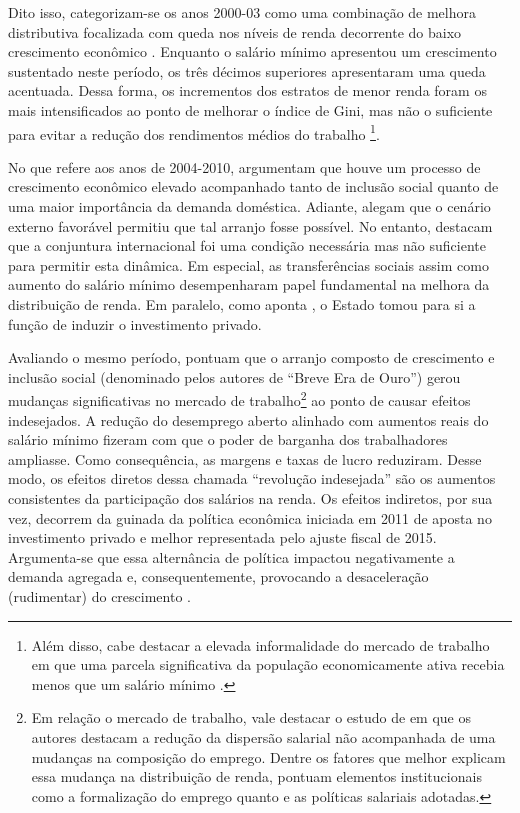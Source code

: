 Dito isso, categorizam-se os anos 2000-03 como uma combinação de melhora distributiva focalizada com queda nos níveis de renda decorrente do baixo crescimento econômico \cite{dedecca_reducao_2014}. Enquanto o salário mínimo apresentou um crescimento sustentado neste período, os três décimos superiores apresentaram uma queda acentuada. Dessa forma, os incrementos dos estratos de menor renda foram os mais intensificados ao ponto de melhorar o índice de Gini, mas não o suficiente para evitar a redução dos rendimentos médios do trabalho \cite{saboia_o_2007}\footnote{Além disso, cabe destacar a elevada informalidade do mercado de trabalho em que uma parcela significativa da população economicamente ativa recebia menos que um salário mínimo \cite[p.~486]{saboia_o_2007}.}. 

No que refere aos anos de 2004-2010, \textcite{correa_notas_2013} argumentam que houve um processo de crescimento econômico elevado acompanhado tanto de inclusão social quanto de uma maior importância da demanda doméstica. Adiante, alegam que o cenário externo favorável permitiu que tal arranjo fosse possível. No entanto, destacam que a conjuntura internacional foi uma condição necessária mas não suficiente para permitir esta dinâmica. Em especial, as transferências sociais assim como aumento do salário mínimo desempenharam papel fundamental na melhora da distribuição de renda. Em paralelo, como aponta \textcite{dos_santos_notas_2013}, o Estado tomou para si a função de induzir o investimento privado.

Avaliando o mesmo período, \textcite{serrano_conflito_2018} pontuam que o arranjo composto de crescimento e inclusão social (denominado pelos autores de ``Breve Era de Ouro'') gerou mudanças significativas no mercado de trabalho\footnote{Em relação o mercado de trabalho, vale destacar o estudo de \textcite{carneiro_politica_2018-1} em que os autores destacam a redução da dispersão salarial não acompanhada de uma mudanças na composição do emprego. Dentre os fatores que melhor explicam essa mudança na distribuição de renda, pontuam elementos institucionais como a formalização do emprego quanto e as políticas salariais adotadas.} ao ponto de causar efeitos indesejados. A redução do desemprego aberto alinhado com aumentos reais do salário mínimo fizeram com que o poder de barganha dos trabalhadores ampliasse. Como consequência, as margens e taxas de lucro reduziram. Desse modo, os efeitos diretos dessa chamada ``revolução indesejada'' são os aumentos consistentes da participação dos salários na renda. Os efeitos indiretos, por sua vez, decorrem da guinada da política econômica iniciada em 2011 de aposta no investimento privado e melhor representada pelo ajuste fiscal de 2015. Argumenta-se que essa alternância de política impactou negativamente a demanda agregada e, consequentemente, provocando a desaceleração (rudimentar) do crescimento \cite{serrano_demanda_2015}.

